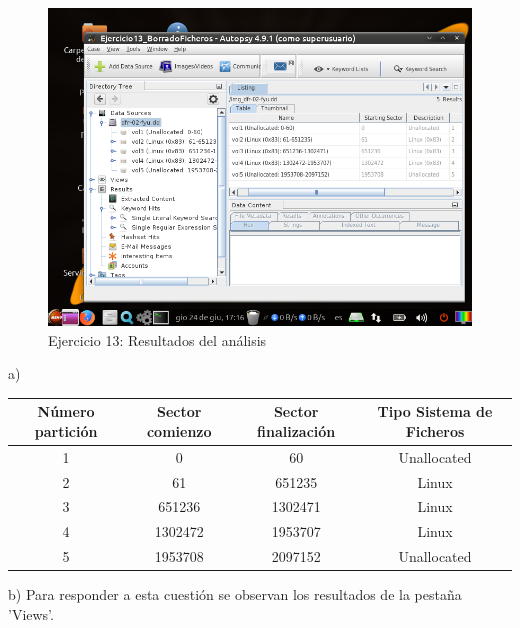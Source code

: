 \documentclass[11pt]{article}
\begin{document}
\begin{figure}[H]
    \caption{Ejercicio 13: Resultados del análisis}
    \centering
    \includegraphics[scale=0.7]{p03/e13-5.png}
\end{figure}

a)

\begin{table}[H]
    \centering
    \begin{tabular}{|c|c|c|c|}
        \hline
        Número partición & Sector comienzo & Sector finalización & Tipo Sistema de Ficheros \\
        \hline\hline
        1 & 0 & 60 & Unallocated \\
        \hline
        2 & 61 & 651235 & Linux \\
        \hline
        3 & 651236 & 1302471 & Linux \\
        \hline
        4 & 1302472 & 1953707 & Linux \\
        \hline
        5 & 1953708 & 2097152 & Unallocated \\
        \hline
    \end{tabular}
\end{table}

b) Para responder a esta cuestión se observan los resultados de la pestaña 'Views'.
\end{document}
